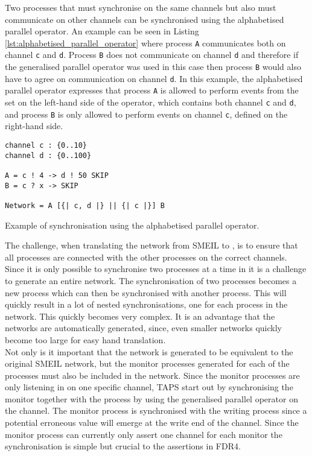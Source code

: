 Two processes that must synchronise on the same channels but also must communicate on other channels can be synchronised using the alphabetised parallel operator. An example can be seen in Listing \ref{lst:alphabetised_parallel_operator} where process \texttt{A} communicates both on channel \texttt{c} and \texttt{d}. Process \texttt{B} does not communicate on channel \texttt{d} and therefore if the generalised parallel operator was used in this case then process \texttt{B} would also have to agree on communication on channel \texttt{d}. In this example, the alphabetised parallel operator expresses that process \texttt{A} is allowed to perform events from the set on the left-hand side of the operator, which contains both channel \texttt{c} and \texttt{d}, and process \texttt{B} is only allowed to perform events on channel \texttt{c}, defined on the right-hand side.
\begin{listing}
\begin{verbatim}
channel c : {0..10}
channel d : {0..100}

A = c ! 4 -> d ! 50 SKIP
B = c ? x -> SKIP

Network = A [{| c, d |} || {| c |}] B
\end{verbatim}
\caption{Example of synchronisation using the alphabetised parallel operator.}
\label{lst:alphabetised_parallel_operator}
\end{listing}


The challenge, when translating the network from SMEIL to \cspm{}, is to ensure that all processes are connected with the other processes on the correct channels.
Since it is only possible to synchronise two processes at a time in \cspm{} it is a challenge to generate an entire network. The synchronisation of two processes becomes a new process which can then be synchronised with another process. This will quickly result in a lot of nested synchronisations, one for each process in the network. This quickly becomes very complex. It is an advantage that the \cspm{} networks are automatically generated, since, even smaller networks quickly become too large for easy hand translation.\\

Not only is it important that the network is generated to be equivalent to the original SMEIL network, but the monitor processes generated for each of the \cspm{} processes must also be included in the network. Since the monitor processes are only listening in on one specific channel, TAPS start out by synchronising the monitor together with the process by using the generalised parallel operator on the channel. The monitor process is synchronised with the writing process since a potential erroneous value will emerge at the write end of the channel. Since the monitor process can currently only assert one channel for each monitor the synchronisation is simple but crucial to the assertions in FDR4.\\

